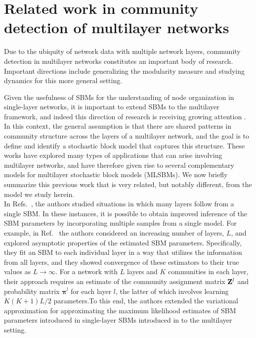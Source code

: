\section{Related work in community detection of multilayer networks}
Due to the ubiquity of network data with multiple network layers, community detection in multilayer networks constitutes an important body of research. Important directions include generalizing the modularity measure \cite{muchamultislice} and studying dynamics \cite{manlio2} for this more general setting. 

Given the usefulness of SBMs for the understanding of node organization in single-layer networks, it is important to extend SBMs to the multilayer framework, and indeed this direction of research is receiving growing attention  \cite{airoldi,mlsbm1,barbillon,catala,thiagomlsbm}. In this context, the general assumption is that there are shared patterns in community structure across the layers of a multilayer network, and the goal is to define and identify a stochastic block model that captures this structure. These works have explored many types of applications that can arise involving multilayer networks,
%
and have therefore given rise to several complementary models for multilayer stochastic block models (MLSBMs). We now briefly summarize this previous work that is very related, but notably different, from the model we study herein.
%
\\\indent 
 In Refs.~\cite{airoldi,mlsbm1,barbillon}, the authors studied situations in which many layers follow from a single SBM. In these instances, it is possible to obtain improved inference of the SBM parameters by incorporating multiple samples from a single model. For example, in Ref.~\cite{airoldi} the authors considered an increasing number of layers, $L$, and explored asymptotic properties of the estimated SBM parameters. Specifically, they fit an SBM to each individual layer in a way that utilizes the information from all layers, and they showed convergence of these estimators to their true values as $L\to\infty$. %
For a network with $L$ layers and $K$ communities in each layer, their approach requires  an estimate of the community assignment matrix ${\bf Z}^l$ and probability matrix ${\boldsymbol \pi}^l$ for each layer $l$, the latter of which involves learning $K(K+1)L/2$ parameters.To this end, the authors extended the variational approximation for approximating the maximum likelihood estimates of SBM parameters introduced in single-layer SBMs introduced in \cite{Dudin} to the multilayer setting.
